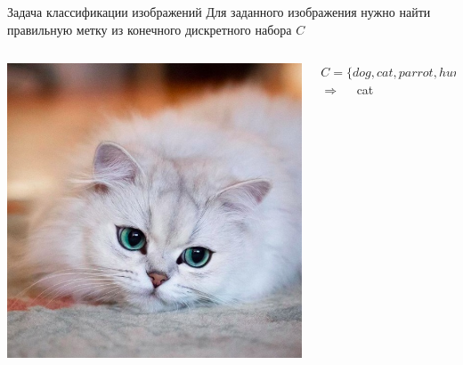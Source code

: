 \documentclass[aspectratio=169, professionalfonts]{beamer}
\begin{document}
\begin{frame}{Задача классификации изображений}
    Для заданного изображения нужно найти правильную метку
    из конечного дискретного набора \( C \)
    \vfill
    \begin{columns}
        \begin{column}{.35\linewidth}
            \includegraphics[width=\linewidth]{graphs/fig8.jpg}
        \end{column}
        \begin{column}{.65\linewidth}
            \( C = \{dog, cat, parrot, human, car, ninja, \ldots \} \) \\
            \hfill
            \vfill
            \( \Longrightarrow \quad \) cat
        \end{column}
    \end{columns}
\end{frame}
\end{document}
